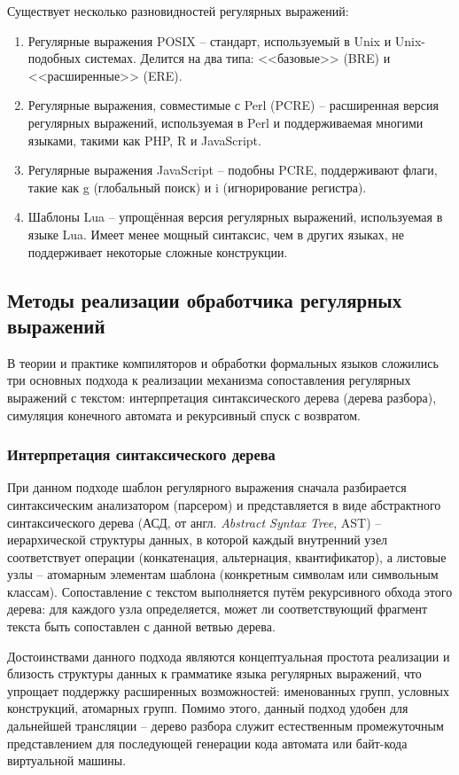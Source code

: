 Существует несколько разновидностей регулярных выражений:
\begin{enumerate}
	\item Регулярные выражения POSIX -- стандарт, используемый в Unix и Unix-подобных системах. Делится на два типа: <<базовые>> (BRE) и <<расширенные>> (ERE).
	\item Регулярные выражения, совместимые с Perl (PCRE) -- расширенная версия регулярных выражений, используемая в Perl и поддерживаемая многими языками, такими как PHP, R и JavaScript.
	\item Регулярные выражения JavaScript -- подобны PCRE, поддерживают флаги, такие как g (глобальный поиск) и i (игнорирование регистра).
	\item Шаблоны Lua -- упрощённая версия регулярных выражений, используемая в языке Lua. Имеет менее мощный синтаксис, чем в других языках, не поддерживает некоторые сложные конструкции.
\end{enumerate}

\subsection{Методы реализации обработчика регулярных выражений}

В теории и практике компиляторов и обработки формальных языков сложились три основных подхода к реализации механизма сопоставления регулярных выражений с текстом: интерпретация синтаксического дерева (дерева разбора), симуляция конечного автомата и рекурсивный спуск с возвратом.

\subsubsection{Интерпретация синтаксического дерева}

При данном подходе шаблон регулярного выражения сначала разбирается синтаксическим анализатором (парсером) и представляется в виде абстрактного синтаксического дерева (АСД, от англ. \textit{Abstract Syntax Tree}, AST) -- иерархической структуры данных, в которой каждый внутренний узел соответствует операции (конкатенация, альтернация, квантификатор), а листовые узлы -- атомарным элементам шаблона (конкретным символам или символьным классам). Сопоставление с текстом выполняется путём рекурсивного обхода этого дерева: для каждого узла определяется, может ли соответствующий фрагмент текста быть сопоставлен с данной ветвью дерева.

Достоинствами данного подхода являются концептуальная простота реализации и близость структуры данных к грамматике языка регулярных выражений, что упрощает поддержку расширенных возможностей: именованных групп, условных конструкций, атомарных групп. Помимо этого, данный подход удобен для дальнейшей трансляции -- дерево разбора служит естественным промежуточным представлением для последующей генерации кода автомата или байт-кода виртуальной машины.

